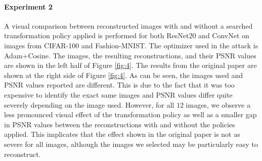 \begin{figure}[h]
        \centering
        \hspace{5mm}
        \label{fig:2}
    \vspace{-5mm}
\end{figure}

\paragraph{Experiment 2} A visual comparison between reconstructed images with and without a searched transformation policy applied is performed for both ResNet20 and ConvNet on images from CIFAR-100 and Fashion-MNIST. The optimizer used in the attack is Adam+Cosine. The images, the resulting reconstructions, and their PSNR values are shown in the left half of Figure \ref{fig:4}. The results from the original paper are shown at the right side of Figure \ref{fig:4}. As can be seen, the images used and PSNR values reported are different. This is due to the fact that it was too expensive to identify the exact same images and PSNR values differ quite severely depending on the image used. However, for all $12$ images, we observe a less pronounced visual effect of the transformation policy as well as a smaller gap in PSNR values between the reconstructions with and without the policies applied. This implicates that the effect shown in the original paper is not as severe for all images, although the images we selected may be particularly easy to reconstruct.

